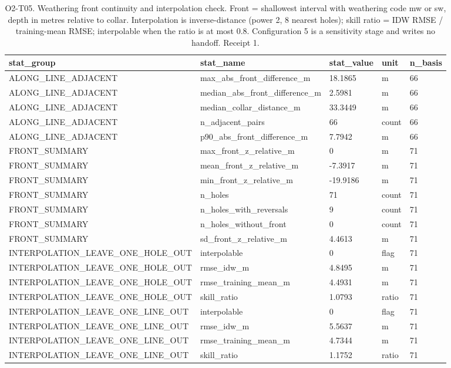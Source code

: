 \begin{table}[ht]
\centering
\footnotesize
\caption{O2-T05. Weathering front continuity and interpolation check. Front = shallowest interval with weathering code mw or sw, depth in metres relative to collar. Interpolation is inverse-distance (power 2, 8 nearest holes); skill ratio = IDW RMSE / training-mean RMSE; interpolable when the ratio is at most 0.8. Configuration 5 is a sensitivity stage and writes no handoff. Receipt 1.}
\label{tab:O2-T05}
\begin{tabular}{lllll}
\toprule
stat\_group & stat\_name & stat\_value & unit & n\_basis \\
\midrule
ALONG\_LINE\_ADJACENT & max\_abs\_front\_difference\_m & 18.1865 & m & 66 \\
ALONG\_LINE\_ADJACENT & median\_abs\_front\_difference\_m & 2.5981 & m & 66 \\
ALONG\_LINE\_ADJACENT & median\_collar\_distance\_m & 33.3449 & m & 66 \\
ALONG\_LINE\_ADJACENT & n\_adjacent\_pairs & 66 & count & 66 \\
ALONG\_LINE\_ADJACENT & p90\_abs\_front\_difference\_m & 7.7942 & m & 66 \\
FRONT\_SUMMARY & max\_front\_z\_relative\_m & 0 & m & 71 \\
FRONT\_SUMMARY & mean\_front\_z\_relative\_m & -7.3917 & m & 71 \\
FRONT\_SUMMARY & min\_front\_z\_relative\_m & -19.9186 & m & 71 \\
FRONT\_SUMMARY & n\_holes & 71 & count & 71 \\
FRONT\_SUMMARY & n\_holes\_with\_reversals & 9 & count & 71 \\
FRONT\_SUMMARY & n\_holes\_without\_front & 0 & count & 71 \\
FRONT\_SUMMARY & sd\_front\_z\_relative\_m & 4.4613 & m & 71 \\
INTERPOLATION\_LEAVE\_ONE\_HOLE\_OUT & interpolable & 0 & flag & 71 \\
INTERPOLATION\_LEAVE\_ONE\_HOLE\_OUT & rmse\_idw\_m & 4.8495 & m & 71 \\
INTERPOLATION\_LEAVE\_ONE\_HOLE\_OUT & rmse\_training\_mean\_m & 4.4931 & m & 71 \\
INTERPOLATION\_LEAVE\_ONE\_HOLE\_OUT & skill\_ratio & 1.0793 & ratio & 71 \\
INTERPOLATION\_LEAVE\_ONE\_LINE\_OUT & interpolable & 0 & flag & 71 \\
INTERPOLATION\_LEAVE\_ONE\_LINE\_OUT & rmse\_idw\_m & 5.5637 & m & 71 \\
INTERPOLATION\_LEAVE\_ONE\_LINE\_OUT & rmse\_training\_mean\_m & 4.7344 & m & 71 \\
INTERPOLATION\_LEAVE\_ONE\_LINE\_OUT & skill\_ratio & 1.1752 & ratio & 71 \\
\bottomrule
\end{tabular}
\end{table}
